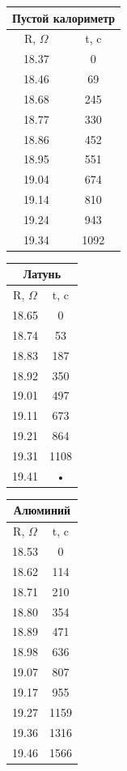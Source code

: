 \documentclass[a4paper,12pt]{article} %
\begin{document}
\begin{tabular}{|c|c|}
\hline
\multicolumn{2}{|c|}{Пустой калориметр} \\
\hline 
R, $\Omega$ & t, c \\ 
\hline
18.37 & 0 \\
\hline 
18.46 & 69 \\ 
\hline 
18.68 & 245 \\ 
\hline 
18.77 & 330 \\ 
\hline 
18.86 & 452 \\ 
\hline 
18.95 & 551 \\ 
\hline 
19.04 & 674 \\ 
\hline 
19.14 & 810 \\ 
\hline 
19.24 & 943 \\ 
\hline 
19.34 & 1092 \\ 

\hline 
\end{tabular} 
\begin{tabular}{|c|c|}
\hline
\multicolumn{2}{|c|}{Латунь      } \\
\hline
R, $\Omega$ & t, c \\ 
\hline 
18.65 & 0 \\ 
\hline 
18.74 & 53 \\ 
\hline 
18.83 & 187 \\ 
\hline 
18.92 & 350 \\ 
\hline 
19.01 & 497 \\ 
\hline 
19.11 & 673 \\ 
\hline 
19.21 & 864 \\ 
\hline 
19.31 & 1108 \\ 
\hline 
19.41 & • \\ 
\hline 
\end{tabular} 
\begin{tabular}{|c|c|}
\hline
\multicolumn{2}{|c|}{Алюминий      } \\
\hline
R, $\Omega$ & t, c \\ 
\hline 
18.53 & 0 \\ 
\hline 
18.62 & 114 \\ 
\hline 
18.71 & 210 \\ 
\hline 
18.80 & 354 \\ 
\hline 
18.89 & 471 \\ 
\hline 
18.98 & 636 \\ 
\hline 
19.07 & 807 \\ 
\hline 
19.17 & 955 \\ 
\hline 
19.27 & 1159 \\ 
\hline 
19.36 & 1316 \\ 
\hline 
19.46 & 1566 \\ 
\hline 
\end{tabular} 
\end{document}
